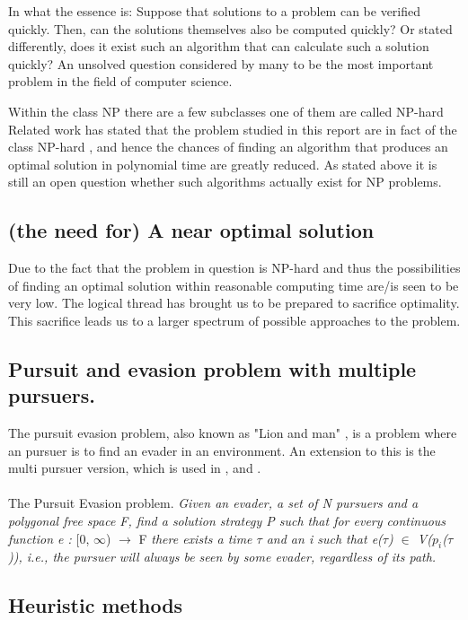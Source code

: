 In what the essence is:
Suppose that solutions to a problem can be verified quickly. Then, can the solutions themselves also be computed quickly?
Or stated differently, does it exist such an algorithm that can calculate such a solution quickly?
An unsolved question considered by many to be the most important problem in the field of computer science. 

Within the class NP there are a few subclasses one of them are called NP-hard 
Related work has stated that the problem studied in this report are in fact of the class NP-hard \cite{paper1}, %
and hence the chances of finding an algorithm that produces an optimal solution in polynomial time are greatly reduced. As stated above it is still an open question whether such algorithms actually exist for NP problems. 

\subsection{(the need for) A near optimal solution}

Due to the fact that the problem in question is NP-hard and thus the possibilities of finding an optimal solution within reasonable computing time are/is seen to be very low. The logical thread has brought us to be prepared to sacrifice optimality.
This sacrifice leads us to a larger spectrum of possible approaches to the problem.


 \subsection {Pursuit and evasion problem with multiple pursuers.}
The pursuit evasion problem, also known as "Lion and man" \cite{Dumitrescu08}, is a problem where an pursuer is to find an evader in an environment. An extension to this is the multi pursuer version, which is used in \cite{paper1},\cite{paper2} and \cite{paper3}.\\
\\
The Pursuit Evasion problem. \emph{Given an evader, a set of N pursuers and a polygonal free space F, find a solution strategy P such that for every continuous function e : }[0, $\infty$) $\rightarrow$ F \emph{there exists a time $\tau$ and an i such that e($\tau$) $\in$ V($p_i$($\tau$)), i.e., the pursuer will always be seen by some evader, regardless of its path.}\cite{paper1}

\subsection{Heuristic methods}

